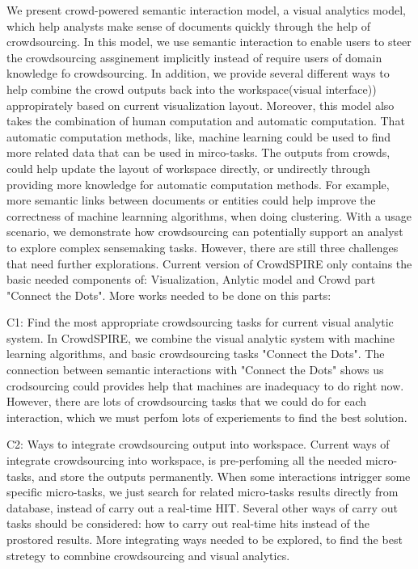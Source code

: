 \documentclass[journal]{vgtc}                %
\begin{document}
We present crowd-powered semantic interaction model, a visual analytics model, which help analysts make sense of documents quickly through the help of crowdsourcing.
In this model, we use semantic interaction to enable users to steer the crowdsourcing assginement implicitly instead of require users of domain knowledge fo crowdsourcing.
In addition, we provide several different ways to help combine the crowd outputs back into the workspace(visual interface)) appropirately based on current visualization layout.
Moreover, this model also takes the combination of human computation and automatic computation.
That automatic computation methods, like, machine learning could be used to find more related data that can be used in mirco-tasks.
The outputs from crowds, could help update the layout of workspace directly, or undirectly through providing more knowledge for automatic computation methods.
For example, more semantic links between documents or entities could help improve the correctness of machine learnning algorithms, when doing clustering.
With a usage scenario, we demonstrate how crowdsourcing can potentially support an analyst to explore complex sensemaking tasks.
However, there are still three challenges that need further explorations.
Current version of CrowdSPIRE only contains the basic needed components of: Visualization, Anlytic model and Crowd part "Connect the Dots".
More works needed to be done on this parts:


C1: Find the most appropriate crowdsourcing tasks for current visual analytic system.
In CrowdSPIRE, we combine the visual analytic system with machine learning algorithms, and basic crowdsourcing tasks "Connect the Dots".
The connection between semantic interactions with "Connect the Dots" shows us crodsourcing could provides help that machines are inadequacy to do right now.
However, there are lots of crowdsourcing tasks that we could do for each interaction, which we must perfom lots of experiements to find the best solution.

C2: Ways to integrate crowdsourcing output into workspace.
Current ways of integrate crowdsourcing into workspace, is pre-perfoming all the needed micro-tasks, and store the outputs permanently.
When some interactions intrigger some specific micro-tasks, we just search for related micro-tasks results directly from database, instead of carry out a real-time HIT.
Several other ways of carry out tasks should be considered: how to carry out real-time hits instead of the prostored results.
More integrating ways needed to be explored, to find the best stretegy to comnbine crowdsourcing and visual analytics.
\end{document}
